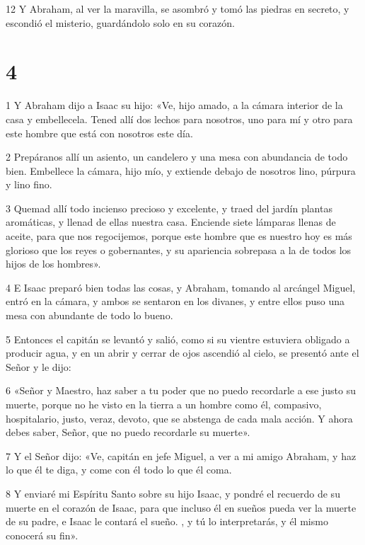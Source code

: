 \par 12 Y Abraham, al ver la maravilla, se asombró y tomó las piedras en secreto, y escondió el misterio, guardándolo solo en su corazón.

\chapter{4}

\par 1 Y Abraham dijo a Isaac su hijo: «Ve, hijo amado, a la cámara interior de la casa y embellecela. Tened allí dos lechos para nosotros, uno para mí y otro para este hombre que está con nosotros este día.

\par 2 Prepáranos allí un asiento, un candelero y una mesa con abundancia de todo bien. Embellece la cámara, hijo mío, y extiende debajo de nosotros lino, púrpura y lino fino.

\par 3 Quemad allí todo incienso precioso y excelente, y traed del jardín plantas aromáticas, y llenad de ellas nuestra casa. Enciende siete lámparas llenas de aceite, para que nos regocijemos, porque este hombre que es nuestro hoy es más glorioso que los reyes o gobernantes, y su apariencia sobrepasa a la de todos los hijos de los hombres».

\par 4 E Isaac preparó bien todas las cosas, y Abraham, tomando al arcángel Miguel, entró en la cámara, y ambos se sentaron en los divanes, y entre ellos puso una mesa con abundante de todo lo bueno.

\par 5 Entonces el capitán se levantó y salió, como si su vientre estuviera obligado a producir agua, y en un abrir y cerrar de ojos ascendió al cielo, se presentó ante el Señor y le dijo:

\par 6 «Señor y Maestro, haz saber a tu poder que no puedo recordarle a ese justo su muerte, porque no he visto en la tierra a un hombre como él, compasivo, hospitalario, justo, veraz, devoto, que se abstenga de cada mala acción. Y ahora debes saber, Señor, que no puedo recordarle su muerte».

\par 7 Y el Señor dijo: «Ve, capitán en jefe Miguel, a ver a mi amigo Abraham, y haz lo que él te diga, y come con él todo lo que él coma.

\par 8 Y enviaré mi Espíritu Santo sobre su hijo Isaac, y pondré el recuerdo de su muerte en el corazón de Isaac, para que incluso él en sueños pueda ver la muerte de su padre, e Isaac le contará el sueño. , y tú lo interpretarás, y él mismo conocerá su fin».

